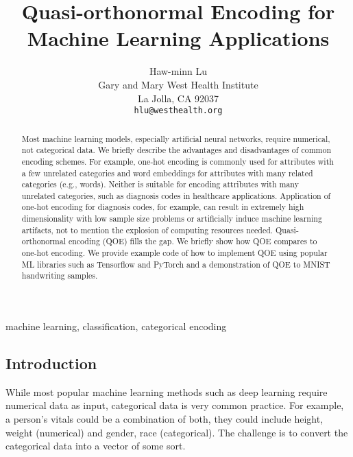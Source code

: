 \documentclass[]{article}
\begin{document}
\title{Quasi-orthonormal Encoding for Machine Learning Applications}\author{Haw-minn Lu\\
Gary and Mary West Health Institute\\
La Jolla, CA 92037\\
\texttt{hlu@westhealth.org}\\
}\maketitle
{}
\newcommand*{\docutilsroleref}{\ref}
\newcommand*{\docutilsrolelabel}{\label}
\newcommand*\DUrolecode[1]{#1}
\providecommand*\DUrolecite[1]{\cite{#1}}
\begin{abstract}Most machine learning models, especially artificial neural networks, require numerical, not categorical data. We briefly describe the advantages and disadvantages of common encoding schemes. For example, one-hot encoding is commonly used for attributes with a few unrelated categories and word embeddings for attributes with many related categories (e.g., words). Neither is suitable for encoding attributes with many unrelated categories, such as diagnosis codes in healthcare applications. Application of one-hot encoding for diagnosis codes, for example, can result in extremely high dimensionality with low sample size problems or artificially induce machine learning artifacts, not to mention the explosion of computing resources needed. Quasi-orthonormal encoding (QOE) fills the gap. We briefly show how QOE compares to one-hot encoding. We provide example code of how to implement QOE using popular ML libraries such as Tensorflow and PyTorch and a demonstration of QOE to MNIST handwriting samples.\end{abstract}machine learning, classification, categorical encoding

\subsection{Introduction%
  \label{introduction}%
}


While most popular machine learning methods such as deep learning
require numerical data as input, categorical data is very common
practice. For example, a person's vitals could be a combination of both,
they could include height, weight (numerical) and gender, race
(categorical). The challenge is to convert the categorical data into a
vector of some sort.
\end{document}
